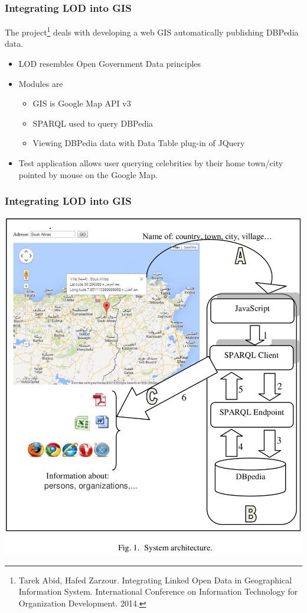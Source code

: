 \documentclass[10pt]{beamer}
\begin{document}

\begin{frame}
  \frametitle{Integrating LOD into GIS}
  The project\footnote{Tarek Abid, Hafed Zarzour. Integrating Linked Open Data in Geographical
Information System. International Conference on Information Technology for Organization Development. 2014. } deals with developing a web GIS automatically publishing DBPedia data.
  \begin{itemize}
  \item LOD resembles Open Government Data principles
  \item Modules are
    \begin{itemize}
    \item GIS is Google Map API v3
    \item SPARQL used to query DBPedia
    \item Viewing DBPedia data with Data Table plug-in of JQuery
    \end{itemize}
  \item Test application allows user querying celebrities by their home town/city pointed by mouse on the Google Map.
  \end{itemize}
\end{frame}


\begin{frame}
  \frametitle{Integrating LOD into GIS}
  \centering
  \includegraphics[width=0.65\linewidth]{integrating-lod-gis-arch.png}
\end{frame}
\end{document}
